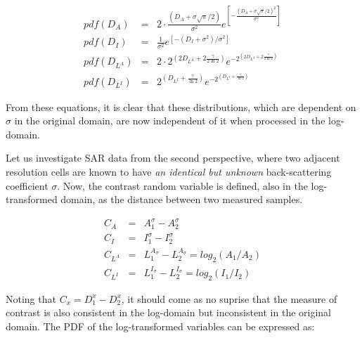 \begin{eqnarray}
pdf(D_A) &=& 2 \cdot \frac{\left( D_A + \sigma \sqrt{\pi}/2 \right)}{\sigma^2}e^{ \left[ - \frac{\left( D_A + \sigma \sqrt{\pi}/2 \right)^2}{\sigma^2}   \right] } \\
pdf(D_I) &=& \frac{1}{\sigma^2}e^{\left[ -\left( D_I + \sigma^2 \right) / \sigma^2 \right] } \\
pdf(D_{L^A}) &=& 2 \cdot 2^{\left( 2 D_{L^A} + 2 \frac{\gamma}{2 \ln2} \right)} e^{-2^{\left( 2 D_{L^A} + 2 \frac{\gamma}{2 \ln2} \right)}}\\
pdf(D_{L^I}) &=& 2^{\left( D_{L^I} + \frac{\gamma}{\ln2} \right)} e^{-2^{\left( D_{L^I} + \frac{\gamma}{\ln2} \right)}}
\end{eqnarray}

From these equations, it is clear that these distributions, which are dependent on $\sigma$ in the original domain, 
are now independent of it when processed in the log-domain.

Let us investigate SAR data from the second perspective,
  where two adjacent resolution cells are known to have \textit{an identical but unknown} back-scattering coefficient $\sigma$.
Now, the contrast random variable is defined, also in the log-transformed domain, as the distance between two measured samples.


\begin{eqnarray}
C_A &=& A_1^\sigma - A_2^\sigma \\
C_I &=& I_1^\sigma - I_2^\sigma \\
C_{L^A} &=& L_1^{A_\sigma} - L_2^{A_\sigma} = log_2 { \left( {A_1}/{A_2} \right) }\\
C_{L^I} &=& L_1^{I_\sigma} - L_2^{I_\sigma} = log_2 { \left( {I_1}/{I_2} \right) }
\end{eqnarray}

Noting that $C_x = D_1^x - D_2^x$, it should come as no suprise that the measure of contrast is also consistent in the 
log-domain but inconsistent in the original domain. The PDF of the log-transformed variables can be expressed as:

